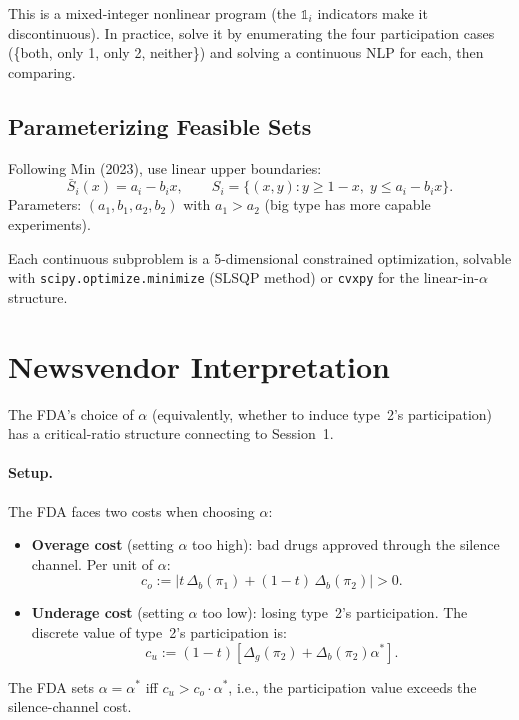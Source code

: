 \documentclass[12pt,a4paper]{article}
\begin{document}
This is a mixed-integer nonlinear program (the
$\mathbb{1}_i$ indicators make it discontinuous). In
practice, solve it by enumerating the four participation
cases (\{both, only 1, only 2, neither\}) and solving
a continuous NLP for each, then comparing.


\subsection{Parameterizing Feasible Sets}

Following Min (2023), use linear upper boundaries:
\[
  \bar{S}_i(x) = a_i - b_i x, \qquad
  S_i = \{(x,y) : y \geq 1-x, \;
    y \leq a_i - b_i x\}.
\]
Parameters: $(a_1, b_1, a_2, b_2)$ with
$a_1 > a_2$ (big type has more capable experiments).

Each continuous subproblem is a 5-dimensional constrained
optimization, solvable with \texttt{scipy.optimize.minimize}
(SLSQP method) or \texttt{cvxpy} for the
linear-in-$\alpha$ structure.


\section{Newsvendor Interpretation}
\label{sec:newsvendor}

The FDA's choice of $\alpha$ (equivalently, whether to
induce type~2's participation) has a critical-ratio
structure connecting to Session~1.

\paragraph{Setup.}
The FDA faces two costs when choosing $\alpha$:

\begin{itemize}
  \item \textbf{Overage cost} (setting $\alpha$ too high):
    bad drugs approved through the silence channel.
    Per unit of $\alpha$:
    \[
      c_o := |t \, \Delta_b(\pi_1)
        + (1-t) \, \Delta_b(\pi_2)| > 0.
    \]
  \item \textbf{Underage cost} (setting $\alpha$ too low):
    losing type~2's participation. The discrete value of
    type~2's participation is:
    \[
      c_u := (1-t)[\Delta_g(\pi_2)
        + \Delta_b(\pi_2) \alpha^*].
    \]
\end{itemize}

The FDA sets $\alpha = \alpha^*$ iff
$c_u > c_o \cdot \alpha^*$, i.e., the participation value
exceeds the silence-channel cost.
\end{document}
